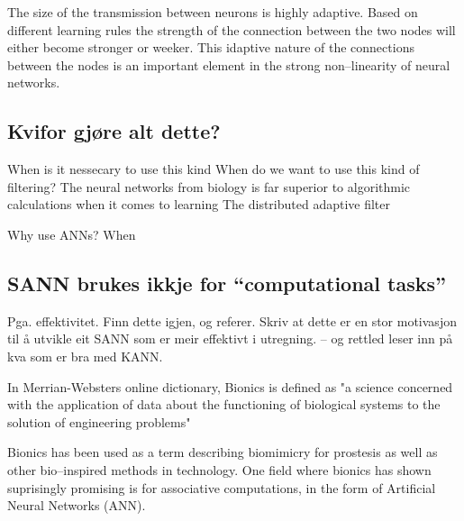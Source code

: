	The size of the transmission between neurons is highly adaptive. Based on different learning rules the strength of the connection between the two nodes will either become stronger or weeker.
	This idaptive nature of the connections between the nodes is an important element in the strong non--linearity of neural networks.

	\subsection{Kvifor gjøre alt dette?}
	When is it nessecary to use this kind
	When do we want to use this kind of filtering?
	The neural networks from biology is far superior to algorithmic calculations when it comes to learning
	The distributed adaptive filter 

	Why use ANNs? 
	When 



	\subsection{SANN brukes ikkje for ``computational tasks''}
	Pga. effektivitet. Finn dette igjen, og referer. Skriv at dette er en stor motivasjon til å utvikle eit SANN som er meir effektivt i utregning.
	-- og rettled leser inn på kva som er bra med KANN.
















In Merrian-Websters online dictionary, Bionics is defined as 
"a science concerned with the application of data about the functioning of biological systems to the solution of engineering problems"

Bionics has been used as a term describing biomimicry for prostesis as well as other bio--inspired methods in technology.
One field where bionics has shown suprisingly promising is for associative computations, in the form of Artificial Neural Networks (ANN).

